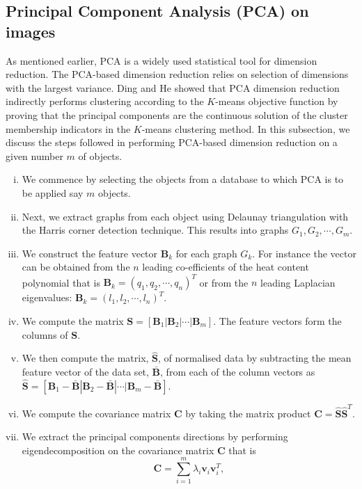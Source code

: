 \documentclass[10pt,a4paper]{article}
\theoremstyle{plain}
\theoremstyle{definition}
\begin{document}
 \subsection{Principal Component Analysis (PCA) on images}
 As mentioned earlier, PCA is a widely used statistical tool for dimension reduction. The PCA-based dimension reduction relies on selection of dimensions with the largest variance. Ding and He \citep{ding2004k} showed that PCA dimension reduction indirectly performs clustering according to the $K$-means objective function by proving that the principal components are the continuous solution of the cluster membership indicators in the $K$-means clustering method.
 In this subsection, we discuss the steps followed in performing  PCA-based dimension reduction on a given number $m$ of objects.
 \begin{enumerate}[i)]
 	\item We commence by selecting the objects from a database to which PCA is to be applied say $m$ objects.
 	\item Next, we extract graphs from each object using Delaunay triangulation with the Harris corner detection technique. This results into graphs $G_1, G_2, \cdots, G_m$.
 	\item We construct the feature vector $\mathbf{B}_k$ for each graph $G_k$. For instance the vector can be obtained from the $n$ leading co-efficients of the heat content polynomial that is $\mathbf{B}_k = (q_1,q_2, \cdots, q_n)^T$ or from the $n$ leading Laplacian eigenvalues: $\mathbf{B}_k = (l_1, l_2, \cdots, l_n)^T$.
 	\item We compute the matrix $\mathbf{S}=[ \mathbf{B}_1|\mathbf{B}_2| \cdots | \mathbf{B}_m]$. The feature vectors form the columns of $\mathbf{S}$.
 	\item We then compute the matrix, $\hat{\mathbf{S}}$, of normalised data by subtracting the mean feature vector of the data set, $\mathbf{\bar{B}}$, from each of the column vectors as  
 	$\hat{\mathbf{S}}=[ \mathbf{B}_1-\mathbf{\bar{B}}|\mathbf{B}_2-\mathbf{\bar{B}}| \cdots | \mathbf{B}_m -\mathbf{\bar{B}}]$. 
 	\item We compute the covariance matrix $\mathbf{C}$ by taking the matrix product $\mathbf{C} = \hat{\mathbf{S}} \hat{\mathbf{S}}^T$.
 	\item We extract the principal components directions by performing eigendecomposition on the covariance matrix $\mathbf{C}$ that is 
 	\begin{equation}
 	\mathbf{C} = \sum _{i=1} ^m \lambda_i \mathbf{v}_i \mathbf{v}_i^T,

\end{equation}
\end{enumerate}
\end{document}
